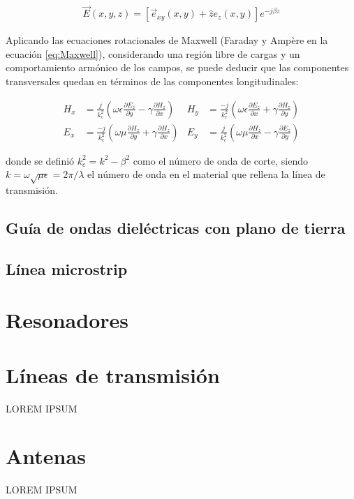 \begin{align}
	\vec{E}(x,y,z) = \left[ \vec{e}_{xy}(x,y) + \hat{z} e_z(x,y) \right] e^{-j\beta z}
\end{align}

Aplicando las ecuaciones rotacionales de Maxwell (Faraday y Ampère en la ecuación \ref{eq:Maxwell}), considerando una región libre de cargas y un comportamiento armónico de los campos, se puede deducir \cite{Fernandez:Electromag} que las componentes transversales quedan en términos de las componentes longitudinales:

\begin{align}
	H_x &= \frac{j}{k_c^2} \left(\omega \epsilon \frac{\partial E_z}{\partial y} - \gamma \frac{\partial H_z}{\partial x} \right) & H_y &= \frac{-j}{k_c^2} \left(\omega \epsilon \frac{\partial E_z}{\partial x} + \gamma \frac{\partial H_z}{\partial y} \right) \\
	E_x &= \frac{-j}{k_c^2} \left(\omega \mu \frac{\partial H_z}{\partial y} + \gamma \frac{\partial H_z}{\partial x} \right) & E_y &= \frac{j}{k_c^2} \left(\omega \mu \frac{\partial H_z}{\partial x} - \gamma \frac{\partial E_z}{\partial y} \right)
\end{align}

donde se definió $k_c^2 = k^2 - \beta^2$ como el número de onda de corte, siendo $k = \omega \sqrt{\mu \epsilon} = 2\pi/\lambda$ el número de onda  en el material que rellena la línea de transmisión.

\subsection{Guía de ondas dieléctricas con plano de tierra}

\subsection{Línea microstrip}

\section{Resonadores}

\section{Líneas de transmisión}
\label{subsec_lineas_de_transmision}
LOREM IPSUM
\section{Antenas}
\label{subsec_antenas}
LOREM IPSUM
